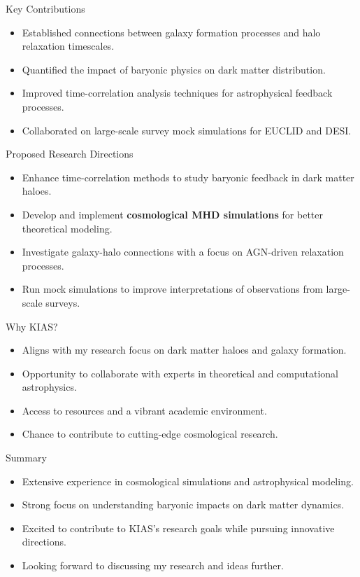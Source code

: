 \documentclass{beamer}
\begin{document}
\begin{frame}{Key Contributions}
    \begin{itemize}
        \item Established connections between galaxy formation processes and halo relaxation timescales.
        \item Quantified the impact of baryonic physics on dark matter distribution.
        \item Improved time-correlation analysis techniques for astrophysical feedback processes.
        \item Collaborated on large-scale survey mock simulations for EUCLID and DESI.
    \end{itemize}
\end{frame}

\begin{frame}{Proposed Research Directions}
    \begin{itemize}
        \item Enhance time-correlation methods to study baryonic feedback in dark matter haloes.
        \item Develop and implement \textbf{cosmological MHD simulations} for better theoretical modeling.
        \item Investigate galaxy-halo connections with a focus on AGN-driven relaxation processes.
        \item Run mock simulations to improve interpretations of observations from large-scale surveys.
    \end{itemize}
\end{frame}

\begin{frame}{Why KIAS?}
    \begin{itemize}
        \item Aligns with my research focus on dark matter haloes and galaxy formation.
        \item Opportunity to collaborate with experts in theoretical and computational astrophysics.
        \item Access to resources and a vibrant academic environment.
        \item Chance to contribute to cutting-edge cosmological research.
    \end{itemize}
\end{frame}

\begin{frame}{Summary}
    \begin{itemize}
        \item Extensive experience in cosmological simulations and astrophysical modeling.
        \item Strong focus on understanding baryonic impacts on dark matter dynamics.
        \item Excited to contribute to KIAS's research goals while pursuing innovative directions.
        \item Looking forward to discussing my research and ideas further.
    \end{itemize}
\end{frame}
\end{document}
